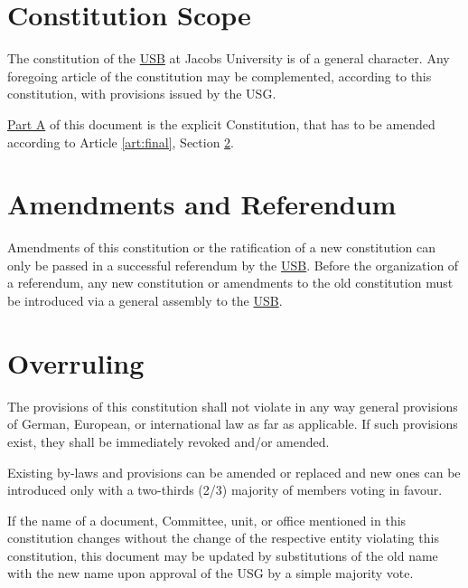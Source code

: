 \label{art:final}

\section{Constitution Scope}
The constitution of the \hyperref[studentbody]{USB} at Jacobs University is of a general character. Any foregoing article of the constitution may be complemented, according to this constitution, with provisions issued by the USG.
\begin{parenum}
\item \hyperref[PartA]{Part A} of this document is the explicit Constitution, that has to be amended according to Article \ref{art:final}, Section \ref{Ammendments}.
\item {}
\item {}
\end{parenum}

\section{Amendments and Referendum}
\label{Ammendments}
Amendments of this constitution or the ratification of a new constitution can only be passed in a successful referendum by the \hyperref[studentbody]{USB}. Before the organization of a referendum, any new constitution or amendments to the old constitution must be introduced via a general assembly to the \hyperref[studentbody]{USB}. 

\section{Overruling} 
The provisions of this constitution shall not violate in any way general provisions of German, European, or international law as far as applicable. If such provisions exist, they shall be immediately revoked and/or amended.

\label{sec:internal-changes}
\begin{parenum}
\item Existing by-laws and provisions can be amended or replaced and new ones can be introduced only with a two-thirds (2/3) majority of members voting in favour.
\item If the name of a document, Committee, unit, or office mentioned in this constitution changes without the change of the respective entity violating this constitution, this document may be updated by substitutions of the old name with the new name upon approval of the USG by a simple majority vote.
\end{parenum}



